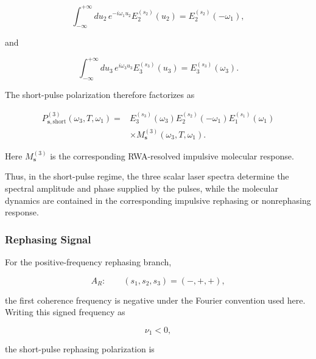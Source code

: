 \documentclass[11pt]{article}
\begin{document}
\begin{equation}
\int_{-\infty}^{+\infty}
du_2\,
e^{-i\omega_1u_2}
E_2^{(s_2)}(u_2)
=
E_2^{(s_2)}(-\omega_1),
\end{equation}

and

\begin{equation}
\int_{-\infty}^{+\infty}
du_3\,
e^{i\omega_3u_3}
E_3^{(s_3)}(u_3)
=
E_3^{(s_3)}(\omega_3).
\end{equation}

The short-pulse polarization therefore factorizes as

\begin{equation}
\boxed{
\begin{aligned}
P_{\mathbf{s},\mathrm{short}}^{(3)}
(\omega_3,T,\omega_1)
={}&
E_3^{(s_3)}(\omega_3)
E_2^{(s_2)}(-\omega_1)
E_1^{(s_1)}(\omega_1)
\\
&\times
M_{\mathbf{s}}^{(3)}
(\omega_3,T,\omega_1).
\end{aligned}
}
\label{eq:short_pulse_factorization}
\end{equation}

Here $M_{\mathbf{s}}^{(3)}$ is the corresponding RWA-resolved
impulsive molecular response.

Thus, in the short-pulse regime, the three scalar laser spectra
determine the spectral amplitude and phase supplied by the pulses,
while the molecular dynamics are contained in the corresponding
impulsive rephasing or nonrephasing response.


\subsubsection{Rephasing Signal}

For the positive-frequency rephasing branch,

\begin{equation}
A_R:
\qquad
(s_1,s_2,s_3)
=
(-,+,+),
\end{equation}

the first coherence frequency is negative under the Fourier convention
used here. Writing this signed frequency as

\begin{equation}
\nu_1<0,
\end{equation}

the short-pulse rephasing polarization is
\end{document}

